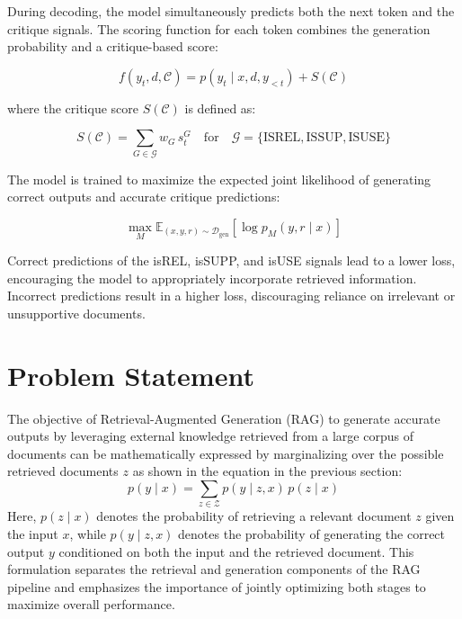 \documentclass[twocolumn, 10pt]{article}
\begin{document}
During decoding, the model simultaneously predicts both the next token and the critique signals.  
The scoring function for each token combines the generation probability and a critique-based score:

\begin{equation*}
f(y_t, d, \mathcal{C}) = p(y_t \mid x, d, y_{<t}) + S(\mathcal{C})
\end{equation*}

where the critique score \(S(\mathcal{C})\) is defined as:

\begin{equation*}
S(\mathcal{C}) = \sum_{G \in \mathcal{G}} w_G \, s^G_t \quad \text{for} \quad \mathcal{G} = \{ \text{ISREL}, \text{ISSUP}, \text{ISUSE} \}
\end{equation*}

The model is trained to maximize the expected joint likelihood of generating correct outputs and accurate critique predictions:

\begin{equation*}
\max_{M} \mathbb{E}_{(x, y, r) \sim \mathcal{D}_{\text{gen}}} \left[ \log p_{M}(y, r \mid x) \right]
\end{equation*}

Correct predictions of the isREL, isSUPP, and isUSE signals lead to a lower loss, encouraging the model to appropriately incorporate retrieved information.  
Incorrect predictions result in a higher loss, discouraging reliance on irrelevant or unsupportive documents.

\section{Problem Statement}
The objective of Retrieval-Augmented Generation (RAG) to generate accurate outputs by leveraging external knowledge retrieved from a large corpus of documents can be mathematically expressed by marginalizing over the possible retrieved documents \( z \) as shown in the equation in the previous section:
\begin{equation*}
p(y \mid x) = \sum_{z \in \mathcal{Z}} p(y \mid z, x) \, p(z \mid x)
\end{equation*}
Here, \( p(z \mid x) \) denotes the probability of retrieving a relevant document \( z \) given the input \( x \), while \( p(y \mid z, x) \) denotes the probability of generating the correct output \( y \) conditioned on both the input and the retrieved document. This formulation separates the retrieval and generation components of the RAG pipeline and emphasizes the importance of jointly optimizing both stages to maximize overall performance.
\end{document}
